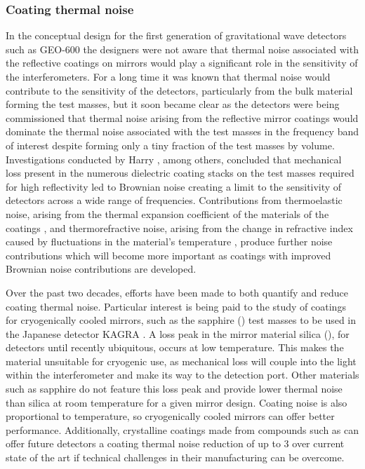 \subsubsection{\label{sec:coating-thermal-noise}Coating thermal noise}
In the conceptual design for the first generation of gravitational wave detectors such as GEO-600 \cite{Willke2002} the designers were not aware that thermal noise associated with the reflective coatings on mirrors would play a significant role in the sensitivity of the interferometers. For a long time it was known that thermal noise would contribute to the sensitivity of the detectors, particularly from the bulk material forming the test masses, but it soon became clear as the detectors were being commissioned that thermal noise arising from the reflective mirror coatings would dominate the thermal noise associated with the test masses in the frequency band of interest despite forming only a tiny fraction of the test masses by volume. Investigations conducted by Harry \etal{} \cite{Harry2002, Harry2007}, among others, concluded that mechanical loss present in the numerous dielectric coating stacks on the test masses required for high reflectivity led to Brownian noise creating a limit to the sensitivity of detectors across a wide range of frequencies. Contributions from thermoelastic noise, arising from the thermal expansion coefficient of the materials of the coatings \cite{Braginsky1999a}, and thermorefractive noise, arising from the change in refractive index caused by fluctuations in the material's temperature \cite{Braginsky2000a}, produce further noise contributions which will become more important as coatings with improved Brownian noise contributions are developed.

Over the past two decades, efforts have been made to both quantify and reduce coating thermal noise. Particular interest is being paid to the study of coatings for cryogenically cooled mirrors, such as the sapphire () test masses to be used in the Japanese detector \gls{KAGRA} \cite{Somiya2012}. A loss peak in the mirror material silica (), for detectors until recently ubiquitous, occurs at low temperature. This makes the material unsuitable for cryogenic use, as mechanical loss will couple into the light within the interferometer and make its way to the detection port. Other materials such as sapphire do not feature this loss peak and provide lower thermal noise than silica at room temperature for a given mirror design. Coating noise is also proportional to temperature, so cryogenically cooled mirrors can offer better performance. Additionally, crystalline coatings made from compounds such as  can offer future detectors a coating thermal noise reduction of up to 3 over current state of the art \cite{Cole2013} if technical challenges in their manufacturing can be overcome.

